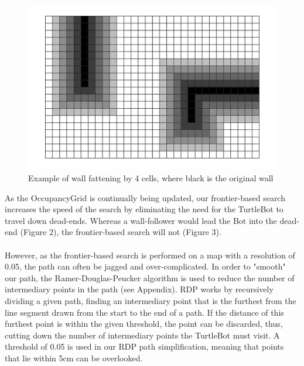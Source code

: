 \documentclass[titlepage,12pt,a4paper]{article}
\begin{document}
\begin{figure}
	\begin{center}
	\includegraphics[scale=0.25]{wallfatten.jpg}
	\caption{Example of wall fattening by 4 cells, where black is the original wall}
	\end{center}
\end{figure}


\pagebreak

\noindent
As the OccupancyGrid is continually being updated, our frontier-based search increases the speed of the search by eliminating the need for the TurtleBot to travel down dead-ends. Whereas a wall-follower would lead the Bot into the dead-end (Figure 2), the frontier-based search will not (Figure 3).\\
\\
However, as the frontier-based search is performed on a map with a resolution of 0.05, the path can often be jagged and over-complicated. In order to "smooth" our path, the Ramer-Douglas-Peucker algorithm is used to reduce the number of intermediary points in the path (see Appendix). RDP works by recursively dividing a given path, finding an intermediary point that is the furthest from the line segment drawn from the start to the end of a path. If the distance of this furthest point is within the given threshold, the point can be discarded, thus, cutting down the number of intermediary points the TurtleBot must visit. A threshold of 0.05 is used in our RDP path simplification, meaning that points that lie within 5cm can be overlooked.\\
\end{document}
